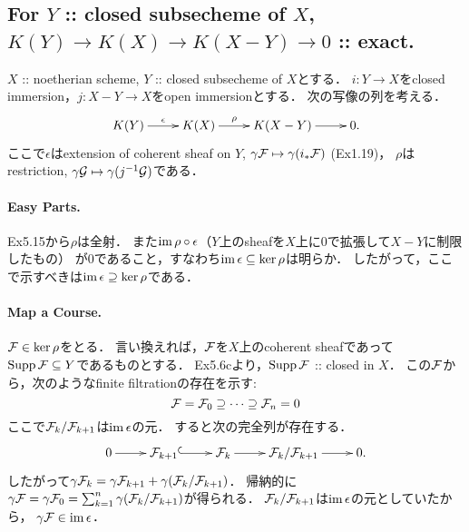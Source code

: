 \documentclass[a4paper]{jsarticle}
\begin{document}
    \subsection{For $Y$ :: closed subsecheme of $X$, $K(Y) \to K(X) \to K(X-Y) \to 0$ :: exact.}
    $X$ :: noetherian scheme, $Y$ :: closed subsecheme of $X$とする．
    $i: Y \to X$をclosed immersion，$j: X-Y \to X$をopen immersionとする．
    次の写像の列を考える．
    \[
        \xymatrix
        {
            K(Y) \ar[r]^-{\epsilon}& K(X) \ar[r]^-{\rho}& K(X-Y) \ar[r]& 0.
       }
    \]
    ここで$\epsilon$はextension of coherent sheaf on $Y$, 
    $\gamma \mathcal{F} \mapsto \gamma (i_* \mathcal{F})$ (Ex1.19)，
    $\rho$はrestriction, $\gamma \mathcal{G} \mapsto \gamma (j^{-1}\mathcal{G})$である．

    \paragraph{Easy Parts.}
    Ex5.15から$\rho$は全射．
    また$\operatorname{im} \rho \circ \epsilon$（$Y$上のsheafを$X$上に$0$で拡張して$X-Y$に制限したもの）
    が$0$であること，すなわち$\operatorname{im} \epsilon \subseteq \ker \rho$は明らか．
    したがって，ここで示すべきは$\operatorname{im} \epsilon \supseteq \ker \rho$である．

    \paragraph{Map a Course.}
    $\mathcal{F} \in \ker \rho$をとる．
    言い換えれば，$\mathcal{F}$を$X$上のcoherent sheafであって
    $\operatorname{Supp} \mathcal{F} \subseteq Y$であるものとする．
    Ex5.6cより，$\operatorname{Supp} \mathcal{F}$ :: closed in $X$．
    この$\mathcal{F}$から，次のようなfinite filtrationの存在を示す:
    \[ \mathcal{F}=\mathcal{F}_0 \supseteq \cdots \supseteq \mathcal{F}_n=0 \]
    ここで$\mathcal{F}_k/\mathcal{F}_{k+1}$は$\operatorname{im} \epsilon$の元．
    すると次の完全列が存在する．
    \[
        \xymatrix
        {
            0 \ar[r]& \shF_{k+1} \ar@{^{(}->}[r]& \shF_k \ar[r]& \shF_{k}/\shF_{k+1} \ar[r]& 0.
        }
    \]
    したがって$\gamma \mathcal{F}_{k}=\gamma \mathcal{F}_{k+1}+\gamma (\mathcal{F}_{k}/\mathcal{F}_{k+1})$．
    帰納的に$\gamma \mathcal{F}=\gamma \mathcal{F}_0=\sum_{k=1}^{n} \gamma (\mathcal{F}_{k}/\mathcal{F}_{k+1})$が得られる．
    $\mathcal{F}_k/\mathcal{F}_{k+1}$は$\operatorname{im} \epsilon$の元としていたから，
    $\gamma \mathcal{F} \in \operatorname{im} \epsilon$．
\end{document}
